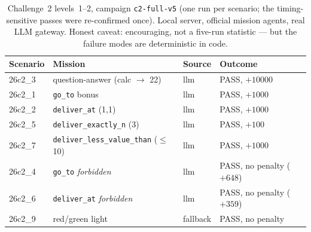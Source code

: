 \begin{table}[ht]
\centering\small
\begin{tabular}{@{}llll@{}}
\toprule
Scenario & Mission & Source & Outcome \\
\midrule
26c2\_3 & question-answer (calc $\to$ 22)      & llm      & PASS, $+10000$ \\
26c2\_1 & \texttt{go\_to} bonus                & llm      & PASS, $+1000$ \\
26c2\_2 & \texttt{deliver\_at} (1,1)           & llm      & PASS, $+1000$ \\
26c2\_5 & \texttt{deliver\_exactly\_n} (3)     & llm      & PASS, $+100$ \\
26c2\_7 & \texttt{deliver\_less\_value\_than} ($\leq$10) & llm & PASS, $+1000$ \\
26c2\_4 & \texttt{go\_to} \emph{forbidden}     & llm      & PASS, no penalty ($+648$) \\
26c2\_6 & \texttt{deliver\_at} \emph{forbidden}& llm      & PASS, no penalty ($+359$) \\
26c2\_9 & red/green light                      & fallback & PASS, no penalty \\
\bottomrule
\end{tabular}
\caption{Challenge~2 levels~1--2, campaign \texttt{c2-full-v5} (one run per
scenario; the timing-sensitive passes were re-confirmed once). Local server,
official mission agents, real LLM gateway. Honest caveat: encouraging, not a
five-run statistic --- but the failure modes are deterministic in code.}
\label{tab:c2}
\end{table}

